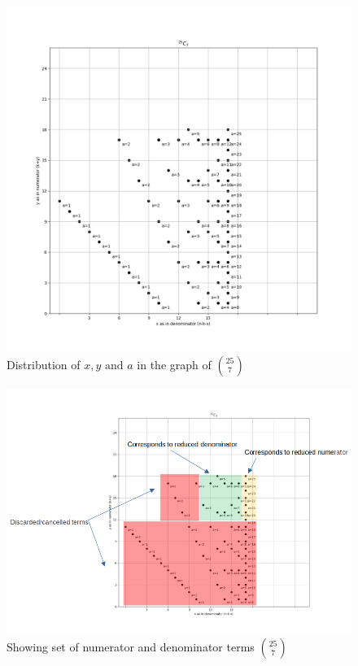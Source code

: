 \documentclass[10pt, twoside]{article}
\newcommand*{\Combination}[2]{\binom{#1}{#2}}%
\begin{document}
\begin{appendices}
\begin{figure}[ph!]
\includegraphics[width=\linewidth]{25_7_alone.png}
\caption{Distribution of $x,y \text{ and } a$ in the graph of $\Combination{25}{7}$}
\label{25_C_7_example}
\end{figure}
\begin{figure}[ph!]
\includegraphics[width=\linewidth]{CalculationOfCombination.png}
\caption{Showing set of numerator and denominator terms $\Combination{25}{7}$}
\label{CalculationOfCombination}
\end{figure}

\end{appendices}
\end{document}
